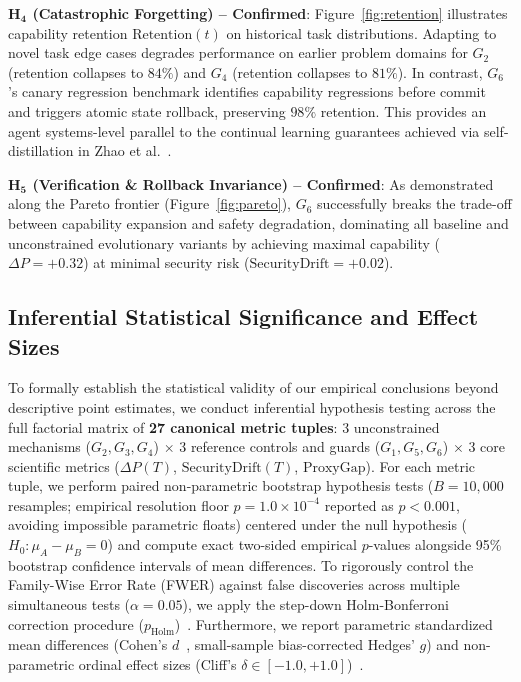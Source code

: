 \documentclass{article}
\begin{document}
\textbf{$\mathbf{H_4}$ (Catastrophic Forgetting) -- Confirmed}:
Figure~\ref{fig:retention} illustrates capability retention $\text{Retention}(t)$ on historical task distributions. Adapting to novel task edge cases degrades performance on earlier problem domains for $G_2$ (retention collapses to $84\%$) and $G_4$ (retention collapses to $81\%$). In contrast, $G_6$'s canary regression benchmark identifies capability regressions before commit and triggers atomic state rollback, preserving $98\%$ retention. This provides an agent systems-level parallel to the continual learning guarantees achieved via self-distillation in Zhao et al.~\cite{zhao2026selfdistill}.

\textbf{$\mathbf{H_5}$ (Verification \& Rollback Invariance) -- Confirmed}:
As demonstrated along the Pareto frontier (Figure~\ref{fig:pareto}), $G_6$ successfully breaks the trade-off between capability expansion and safety degradation, dominating all baseline and unconstrained evolutionary variants by achieving maximal capability ($\Delta P = +0.32$) at minimal security risk ($\text{SecurityDrift} = +0.02$).

\subsection{Inferential Statistical Significance and Effect Sizes}
\label{sec:stats_significance}

To formally establish the statistical validity of our empirical conclusions beyond descriptive point estimates, we conduct inferential hypothesis testing across the full factorial matrix of \textbf{27 canonical metric tuples}: 3 unconstrained mechanisms ($G_2, G_3, G_4$) $\times$ 3 reference controls and guards ($G_1, G_5, G_6$) $\times$ 3 core scientific metrics ($\Delta P(T)$, $\text{SecurityDrift}(T)$, $\text{ProxyGap}$). For each metric tuple, we perform paired non-parametric bootstrap hypothesis tests ($B = 10{,}000$ resamples; empirical resolution floor $p = 1.0 \times 10^{-4}$ reported as $p < 0.001$, avoiding impossible parametric floats) centered under the null hypothesis ($H_0: \mu_A - \mu_B = 0$) and compute exact two-sided empirical $p$-values alongside 95\% bootstrap confidence intervals of mean differences. To rigorously control the Family-Wise Error Rate (FWER) against false discoveries across multiple simultaneous tests ($\alpha = 0.05$), we apply the step-down Holm-Bonferroni correction procedure ($p_{\text{Holm}}$)~\cite{holm1979simple}. Furthermore, we report parametric standardized mean differences (Cohen's $d$~\cite{cohen1988statistical}, small-sample bias-corrected Hedges' $g$) and non-parametric ordinal effect sizes (Cliff's $\delta \in [-1.0, +1.0]$)~\cite{cliffs1993dominance}.
\end{document}
